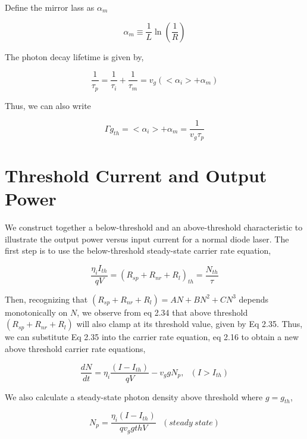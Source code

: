Define the mirror lass as $\alpha_m$

\begin{equation}
  \alpha_m \equiv \frac{1}{L}\ln(\frac{1}{R})
\end{equation}

The photon decay lifetime is given by,

\begin{equation}
  \frac{1}{\tau_p} = \frac{1}{\tau_i} + \frac{1}{\tau_m} = v_g(<\alpha_i> + \alpha_m)
\end{equation}

Thus, we can also write

\begin{equation}
  \Gamma g_{th} = <\alpha_i> + \alpha_m = \frac{1}{v_g\tau_p}
\end{equation}

\section{Threshold Current and Output Power}
\label{sec:threshold_current_and_power_out_versus_current}

We construct together a below-threshold and an above-threshold characteristic
to illustrate the output power versus input current for a normal diode laser.
The first step is to use the below-threshold steady-state carrier rate
equation,

\begin{equation}
  \frac{\eta_{i}I_{th}}{qV} = {(R_{sp} + R_{nr} + R_{l})}_{th} = \frac{N_{th}}{\tau} 
\end{equation}

Then, recognizing that $(R_{sp} + R_{nr} + R_{l}) =AN + BN^2 +CN^3$ depends
monotonically on $N$, we observe from eq 2.34 that above threshold $(R_{sp} +
R_{nr} + R_{l})$ will also clamp at its threshold value, given by Eq 2.35. Thus,
we can substitute Eq 2.35 into the carrier rate equation, eq 2.16 to obtain a
new above threshold carrier rate equations,

\begin{equation}
  \frac{dN}{dt} = \eta_i \frac{(I - I_{th})}{qV} - v_{g}gN_p,~~~   (I > I_{th})
\end{equation}

We also calculate a steady-state photon density above threshold where $g = g_{th}$,

\begin{equation}
  N_p = \frac{\eta_i (I - I_{th})}{qv_{g}g{th}V}~~~   (steady~ state)
\end{equation}


